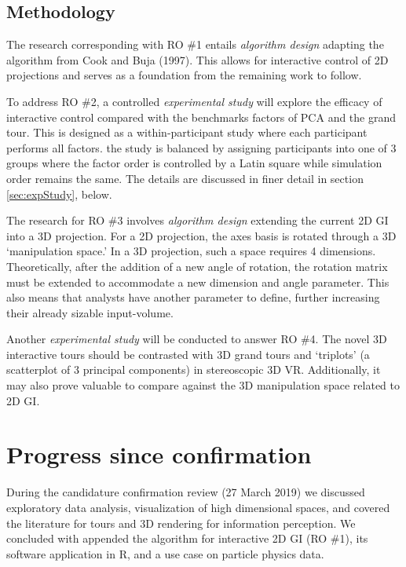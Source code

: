 \documentclass[
  11,
]{article}
\begin{document}
\hypertarget{methodology}{%
\subsection{Methodology}\label{methodology}}

The research corresponding with RO \#1 entails \emph{algorithm design} adapting the algorithm from Cook and Buja (1997). This allows for interactive control of 2D projections and serves as a foundation from the remaining work to follow.

To address RO \#2, a controlled \emph{experimental study} will explore the efficacy of interactive control compared with the benchmarks factors of PCA and the grand tour. This is designed as a within-participant study where each participant performs all factors. the study is balanced by assigning participants into one of 3 groups where the factor order is controlled by a Latin square while simulation order remains the same. The details are discussed in finer detail in section \ref{sec:expStudy}, below.

The research for RO \#3 involves \emph{algorithm design} extending the current 2D GI into a 3D projection. For a 2D projection, the axes basis is rotated through a 3D `manipulation space.' In a 3D projection, such a space requires 4 dimensions. Theoretically, after the addition of a new angle of rotation, the rotation matrix must be extended to accommodate a new dimension and angle parameter. This also means that analysts have another parameter to define, further increasing their already sizable input-volume.

Another \emph{experimental study} will be conducted to answer RO \#4. The novel 3D interactive tours should be contrasted with 3D grand tours and `triplots' (a scatterplot of 3 principal components) in stereoscopic 3D VR. Additionally, it may also prove valuable to compare against the 3D manipulation space related to 2D GI.

\hypertarget{progress-since-confirmation}{%
\section{Progress since confirmation}\label{progress-since-confirmation}}

During the candidature confirmation review (27 March 2019) we discussed exploratory data analysis, visualization of high dimensional spaces, and covered the literature for tours and 3D rendering for information perception. We concluded with appended the algorithm for interactive 2D GI (RO \#1), its software application in R, and a use case on particle physics data.
\end{document}
